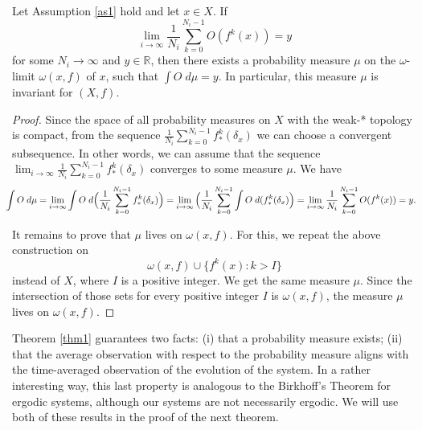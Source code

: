 \documentclass[format=acmsmall, authorversion, screen=true]{acmart}
\def\R{\ensuremath{\mathbb{R}}}
\begin{document}
\begin{theorem}\label{thm1}
Let Assumption \ref{as1} hold and let $x\in X$. If
\begin{equation}\label{eq1}
\lim_{i\to\infty}\frac1{N_i}\sum_{k=0}^{N_i-1}O(f^k(x))=y
\end{equation}
for some $N_i\to\infty$ and $y\in \R$, then there exists a probability
measure $\mu$ on the $\omega$-limit $\omega(x,f)$ of $x$, such that
$\int O\;d\mu=y$. In particular, this measure $\mu$ is invariant for $(X,f)$.
\end{theorem}

\begin{proof}
Since the space of all probability measures on $X$ with the weak-*
topology is compact, from the sequence
$\frac1{N_i}\sum_{k=0}^{N_i-1}f^k_*(\delta_x)$ we can
choose a convergent subsequence. In other words, we can assume that the
sequence
$\lim_{i\to\infty}\frac1{N_i}\sum_{k=0}^{N_i-1}f^k_*(\delta_x)$
converges to some measure $\mu$. We have
\[\hspace{-0.1in}\int O\;d\mu=\lim_{i\to\infty}\int O\;d\Big(\frac1{N_i}\sum_{k=0}^{N_i-1}
f^k_*(\delta_x)\Big)=\lim_{i\to\infty}\Big(\frac1{N_i}\sum_{k=0}^{N_i-1}
\int O\;d(f^k_*(\delta_x)\Big)\\
=\lim_{i\to\infty}\frac1{N_i}\sum_{k=0}^{N_i-1}O(f^k(x))=y.\]

It remains to prove that $\mu$ lives on $\omega(x,f)$. For this, we
repeat the above construction on
\begin{equation}\label{eq2}
\omega(x,f)\cup\{f^k(x):k>I\}
\end{equation}
instead of $X$, where $I$ is a positive integer. We get the same measure $\mu$. Since the intersection
of those sets for every positive integer $I$ is $\omega(x,f)$, the
measure $\mu$ lives on $\omega(x,f)$.
\end{proof}



Theorem \ref{thm1} guarantees two facts: (i) that a probability measure exists; (ii) that the average observation with respect to the probability measure aligns with the time-averaged observation of the evolution of the system. In a rather interesting way, this last property is analogous to the Birkhoff's Theorem for ergodic systems, although our systems are not necessarily ergodic.
We will use both of these results in the proof of the next theorem.
\end{document}
